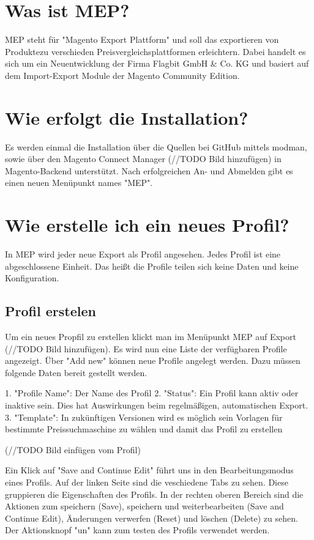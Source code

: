 \documentclass[a4paper]{article}
\begin{document}
\section{Was ist MEP?}
MEP steht für "Magento Export Plattform" und soll das exportieren von
Produktezu verschieden Preisvergleichsplattformen erleichtern. Dabei 
handelt es sich um ein Neuentwicklung der Firma Flagbit GmbH \& Co. KG 
und basiert auf dem Import-Export Module der Magento Community Edition.

\section{Wie erfolgt die Installation?}
Es werden einmal die Installation über die Quellen bei GitHub mittels 
modman, sowie über den Magento Connect Manager (//TODO Bild hinzufügen) in
Magento-Backend unterstützt.  Nach erfolgreichen An- und Abmelden gibt 
es einen neuen Menüpunkt names "MEP".

\section{Wie erstelle ich ein neues Profil?}
In MEP wird jeder neue Export als Profil angesehen. Jedes Profil ist 
eine abgeschlossene Einheit. Das heißt die Profile teilen sich keine 
Daten und keine Konfiguration.

\subsection{Profil erstelen}
Um ein neues Propfil zu erstellen klickt man im Menüpunkt MEP auf 
Export (//TODO Bild hinzufügen). Es wird nun eine Liste der verfügbaren 
Profile angezeigt. Über "Add new" können neue Profile angelegt 
werden. Dazu müssen folgende Daten bereit gestellt werden.

1. "Profile Name": Der Name des Profil
2. "Status": Ein Profil kann aktiv oder inaktive sein. Dies hat 
Auswirkungen beim regelmäßigen, automatischen Export.
3. "Template": In zukünftigen Versionen wird es möglich sein Vorlagen 
für bestimmte Preissuchmaschine zu wählen und damit das Profil zu 
erstellen


(//TODO Bild einfügen vom Profil)


Ein Klick auf "Save and Continue Edit" führt uns in den 
Bearbeitungsmodus eines Profils. Auf der linken Seite sind die 
veschiedene Tabs zu sehen. Diese gruppieren die Eigenschaften des 
Profils. In der rechten oberen Bereich sind die Aktionen zum 
speichern (Save), speichern und weiterbearbeiten (Save and Continue 
Edit), Änderungen verwerfen (Reset) und löschen (Delete) zu sehen. 
Der Aktionsknopf "un" kann zum testen des Profils verwendet werden. 
\end{document}
